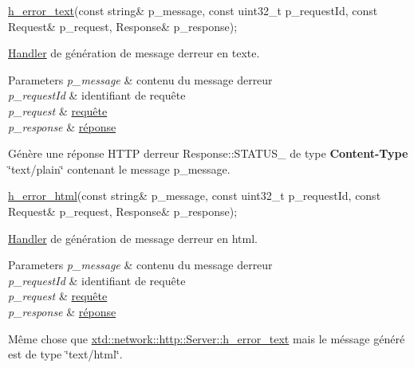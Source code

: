 \begin{DoxyItemize}
\item 
\begin{DoxyCode}
\hyperlink{classxtd_1_1network_1_1http_1_1Server_ad57a524ff44201af997e2d3557557623}{h\_error\_text}(\textcolor{keyword}{const} \textcolor{keywordtype}{string}& p\_message, \textcolor{keyword}{const} uint32\_t p\_requestId, \textcolor{keyword}{const} Request& p\_request, 
      Response& p\_response); 
\end{DoxyCode}
 \hyperlink{classxtd_1_1network_1_1http_1_1Server_1_1Handler}{Handler} de génération de message d\textquotesingle{}erreur en texte. 
\begin{DoxyParams}{Parameters}
{\em p\+\_\+message} & contenu du message d\textquotesingle{}erreur \\
\hline
{\em p\+\_\+request\+Id} & identifiant de requête \\
\hline
{\em p\+\_\+request} & \hyperlink{classxtd_1_1network_1_1http_1_1Request}{requête} \\
\hline
{\em p\+\_\+response} & \hyperlink{classxtd_1_1network_1_1http_1_1Response}{réponse}\\
\hline
\end{DoxyParams}
Génère une réponse H\+T\+TP d\textquotesingle{}erreur Response\+::\+S\+T\+A\+T\+U\+S\+\_ de type {\bfseries Content-\/\+Type} \char`\"{}text/plain\char`\"{} contenant le message p\+\_\+message.
\item 
\begin{DoxyCode}
\hyperlink{classxtd_1_1network_1_1http_1_1Server_a0edee265d48418b258fb450426e10905}{h\_error\_html}(\textcolor{keyword}{const} \textcolor{keywordtype}{string}& p\_message, \textcolor{keyword}{const} uint32\_t p\_requestId, \textcolor{keyword}{const} Request& p\_request, 
      Response& p\_response); 
\end{DoxyCode}
 \hyperlink{classxtd_1_1network_1_1http_1_1Server_1_1Handler}{Handler} de génération de message d\textquotesingle{}erreur en html. 
\begin{DoxyParams}{Parameters}
{\em p\+\_\+message} & contenu du message d\textquotesingle{}erreur \\
\hline
{\em p\+\_\+request\+Id} & identifiant de requête \\
\hline
{\em p\+\_\+request} & \hyperlink{classxtd_1_1network_1_1http_1_1Request}{requête} \\
\hline
{\em p\+\_\+response} & \hyperlink{classxtd_1_1network_1_1http_1_1Response}{réponse}\\
\hline
\end{DoxyParams}
Même chose que \hyperlink{classxtd_1_1network_1_1http_1_1Server_ad57a524ff44201af997e2d3557557623}{xtd\+::network\+::http\+::\+Server\+::h\+\_\+error\+\_\+text} mais le méssage généré est de type \char`\"{}text/html\char`\"{}.
\end{DoxyItemize}

